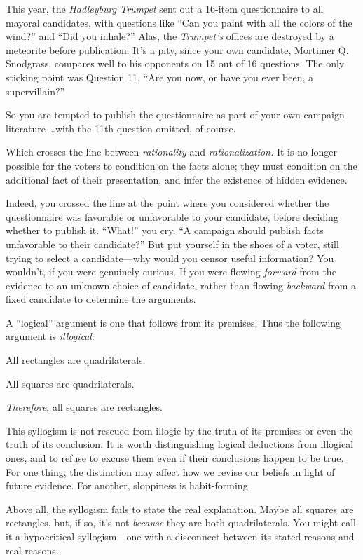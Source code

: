 {
 This year, the \textit{Hadleyburg Trumpet} sent out a 16-item
questionnaire to all mayoral candidates, with questions like
``Can you paint with all the colors of the
wind?'' and ``Did you
inhale?'' Alas, the
\textit{Trumpet's} offices are destroyed by a meteorite
before publication. It's a pity, since your own
candidate, Mortimer Q. Snodgrass, compares well to his opponents on 15
out of 16 questions. The only sticking point was Question 11,
``Are you now, or have you ever been, a
supervillain?''}

{
 So you are tempted to publish the questionnaire as part of your
own campaign literature \ldots with the 11th question omitted, of
course.}

{
 Which crosses the line between \textit{rationality} and
\textit{rationalization.} It is no longer possible for the voters to
condition on the facts alone; they must condition on the additional
fact of their presentation, and infer the existence of hidden
evidence.}

{
 Indeed, you crossed the line at the point where you considered
whether the questionnaire was favorable or unfavorable to your
candidate, before deciding whether to publish it.
``What!'' you cry.
``A campaign should publish facts unfavorable to their
candidate?'' But put yourself in the shoes of a
voter, still trying to select a candidate---why would you censor useful
information? You wouldn't, if you were genuinely
curious. If you were flowing \textit{forward} from the evidence to an
unknown choice of candidate, rather than flowing \textit{backward} from
a fixed candidate to determine the arguments.}

{
 A ``logical'' argument is one
that follows from its premises. Thus the following argument is
\textit{illogical}:}

{
 All rectangles are quadrilaterals.}

{
 All squares are quadrilaterals.}

{
 \textit{Therefore}, all squares are rectangles.}

{
 This syllogism is not rescued from illogic by the truth of its
premises or even the truth of its conclusion. It is worth
distinguishing logical deductions from illogical ones, and to refuse to
excuse them even if their conclusions happen to be true. For one thing,
the distinction may affect how we revise our beliefs in light of future
evidence. For another, sloppiness is habit-forming.}

{
 Above all, the syllogism fails to state the real explanation.
Maybe all squares are rectangles, but, if so, it's not
\textit{because} they are both quadrilaterals. You might call it a
hypocritical syllogism---one with a disconnect between its stated
reasons and real reasons.}

